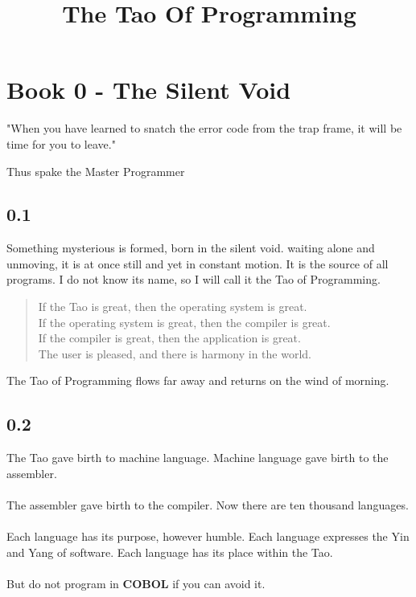 \documentclass[14pt, letterpaper]{book}
\title{The Tao Of Programming}
\date{}
\begin{document}
\maketitle

\chapter*{Book 0 - The Silent Void}
\epigraph{"When you have learned to snatch the error code from the trap frame, it will be time for you to leave."}{Thus spake the Master Programmer}

\section*{0.1}

Something mysterious is formed, born in the silent void. waiting alone and unmoving, it is at once still and yet in constant motion. It is the source of all programs. I do not know its name, so I will call it the Tao of Programming.


\begin{verse}
If the Tao is great, then the operating system is great. \\
If the operating system is great, then the compiler is great. \\
If the compiler is great, then the application is great. \\
The user is pleased, and there is harmony in the world.\\
\end{verse}

The Tao of Programming flows far away and returns on the wind of morning.

\section*{0.2}

The Tao gave birth to machine language. Machine language gave birth to the assembler. \\
\\
The assembler gave birth to the compiler. Now there are ten thousand languages.\\
\\
Each language has its purpose, however humble. Each language expresses the Yin and Yang of software. Each language has its place within the Tao.\\
\\
But do not program in \textbf{COBOL} if you can avoid it.
\end{document}
